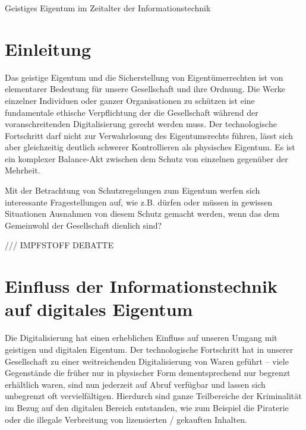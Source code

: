 \documentclass[journal]{IEEEtran}
\begin{document}

\begin{onecolumn}

\begin{center}
	\Large{Geistiges Eigentum im Zeitalter der Informationstechnik}\\
	\vspace{18pt}\hline
\end{center}
    
\section*{Einleitung}

Das geistige Eigentum und die Sicherstellung von Eigentümerrechten ist von
elementarer Bedeutung für unsere Gesellschaft und ihre Ordnung. Die Werke einzelner 
Individuen oder ganzer Organisationen zu schützen ist eine fundamentale ethische 
Verpflichtung der die Gesellschaft während der voranschreitenden Digitalisierung 
gerecht werden muss. Der technologische Fortschritt darf nicht zur Verwahrlosung des 
Eigentumsrechts führen, lässt sich aber gleichzeitig deutlich schwerer Kontrollieren 
als physisches Eigentum. Es ist ein komplexer Balance-Akt zwischen dem Schutz von 
einzelnen gegenüber der Mehrheit. 

Mit der Betrachtung von Schutzregelungen zum Eigentum werfen sich interessante 
Fragestellungen auf, wie z.B. dürfen oder müssen in gewissen Situationen Ausnahmen 
von diesem Schutz gemacht werden, wenn das dem Gemeinwohl der Gesellschaft dienlich 
sind?

/// IMPFSTOFF DEBATTE

\section*{Einfluss der Informationstechnik auf digitales Eigentum}

Die Digitalisierung hat einen erheblichen Einfluss auf unseren Umgang 
mit geistigen und digitalen Eigentum. 
Der technologische Fortschritt hat in unserer Gesellschaft zu einer weitreichenden
Digitalisierung von Waren geführt – viele Gegenstände die früher 
nur in physischer Form dementsprechend nur begrenzt erhältlich waren, sind nun 
jederzeit auf Abruf verfügbar und lassen sich unbegrenzt oft vervielfältigen. 
Hierdurch sind ganze Teilbereiche der Kriminalität im Bezug auf den digitalen Bereich 
entstanden, wie zum Beispiel die Piraterie oder die illegale Verbreitung von
lizensierten / gekauften Inhalten.


\end{onecolumn}
\end{document}

